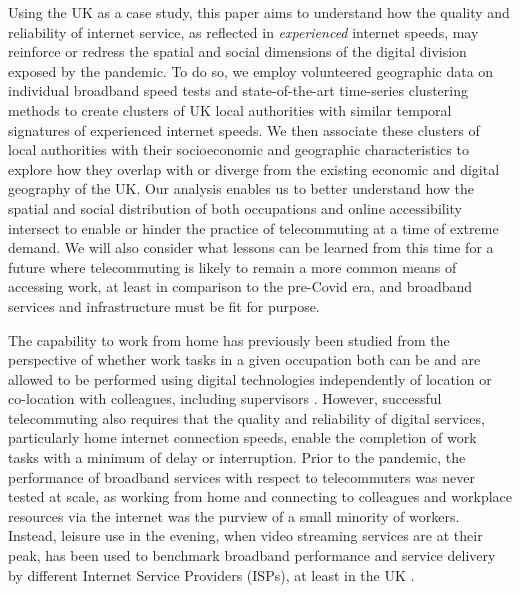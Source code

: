 \documentclass[Royal,times,sageh]{sagej}
\begin{document}
Using the UK as a case study, this paper aims to understand how the
quality and reliability of internet service, as reflected in
\emph{experienced} internet speeds, may reinforce or redress the spatial
and social dimensions of the digital division exposed by the pandemic.
To do so, we employ volunteered geographic data on individual broadband
speed tests and state-of-the-art time-series clustering methods to
create clusters of UK local authorities with similar temporal signatures
of experienced internet speeds. We then associate these clusters of
local authorities with their socioeconomic and geographic
characteristics to explore how they overlap with or diverge from the
existing economic and digital geography of the UK. Our analysis enables
us to better understand how the spatial and social distribution of both
occupations and online accessibility intersect to enable or hinder the
practice of telecommuting at a time of extreme demand. We will also
consider what lessons can be learned from this time for a future where
telecommuting is likely to remain a more common means of accessing work,
at least in comparison to the pre-Covid era, and broadband services and
infrastructure must be fit for purpose.

The capability to work from home has previously been studied from the
perspective of whether work tasks in a given occupation both can be and
are allowed to be performed using digital technologies independently of
location or co-location with colleagues, including supervisors
\citep{allen2015effective, singh2013modeling}. However, successful
telecommuting also requires that the quality and reliability of digital
services, particularly home internet connection speeds, enable the
completion of work tasks with a minimum of delay or interruption. Prior
to the pandemic, the performance of broadband services with respect to
telecommuters was never tested at scale, as working from home and
connecting to colleagues and workplace resources via the internet was
the purview of a small minority of workers. Instead, leisure use in the
evening, when video streaming services are at their peak, has been used
to benchmark broadband performance and service delivery by different
Internet Service Providers (ISPs), at least in the UK \citep{ofcom2017}.
\end{document}
